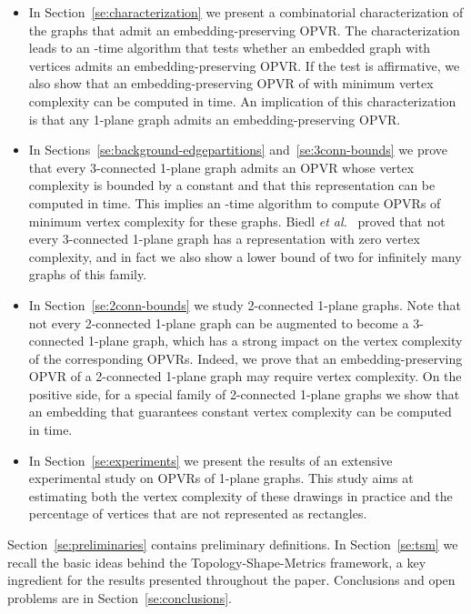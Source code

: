 \documentclass{article}
\newcommand{\opvr}{OPVR\xspace}
\begin{document}
\begin{itemize}

\item In Section~\ref{se:characterization} we present a combinatorial characterization of the graphs that admit an embedding-preserving \opvr. The characterization leads to an -time algorithm that tests whether an embedded graph  with  vertices admits an embedding-preserving \opvr. If the test is affirmative, we also show that an embedding-preserving \opvr of  with minimum vertex complexity can be computed in  time. An implication of this characterization is that any 1-plane graph admits an embedding-preserving \opvr.

\item In Sections~\ref{se:background-edgepartitions} and~\ref{se:3conn-bounds} we prove that every 3-connected 1-plane graph admits an \opvr whose vertex complexity is bounded by a constant and that this representation can be computed in  time. This implies an -time algorithm to compute {\opvr}s of minimum vertex complexity for these graphs. Biedl {\em et al.}~\cite{SoCG} proved that not every 3-connected 1-plane graph has a representation with zero vertex complexity, and in fact we also show a lower bound of two for infinitely many graphs of this family.

\item In Section~\ref{se:2conn-bounds} we study 2-connected 1-plane graphs. Note that not every 2-connected 1-plane graph can be augmented to become a 3-connected 1-plane graph, which has a strong impact on the vertex complexity of the corresponding {\opvr}s. Indeed, we prove that an embedding-preserving {\opvr} of a 2-connected 1-plane graph may require  vertex complexity. On the positive side, for a special family of 2-connected 1-plane graphs we show that an embedding that guarantees constant vertex complexity can be computed in  time.

\item In Section~\ref{se:experiments} we present the results of an extensive experimental study on {\opvr}s of 1-plane graphs. This study aims at estimating both the vertex complexity of these drawings in practice and the percentage of vertices that are not represented as rectangles.
\end{itemize}

Section~\ref{se:preliminaries} contains preliminary definitions. In Section~\ref{se:tsm} we recall the basic ideas behind the Topology-Shape-Metrics framework, a key ingredient for the results presented throughout the paper. Conclusions and open problems are in Section~\ref{se:conclusions}.
\end{document}
